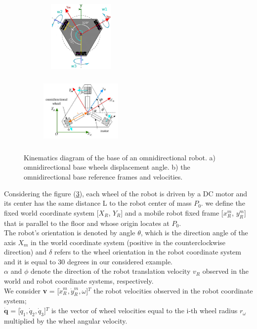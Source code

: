 \begin{figure}[H]
  \centering
  \begin{subfigure}[b]{0.4\textwidth}
     \centering
      \includegraphics[width=4cm, height=3.5cm]{images/03-foundation/triskarbase1}
	\caption{}
	\label{triskar1} 
  \end{subfigure}
  \begin{subfigure}[b]{0.4\textwidth}
  \centering
      \includegraphics[width=4cm, height=3.5cm]{images/03-foundation/triskarbase2}
	\caption{}
	\label{triskar2} 
  \end{subfigure}
  \caption{Kinematics diagram of the base of an omnidirectional robot. a) omnidirectional base wheels displacement angle. b) the omnidirectional base reference frames and velocities.}
\end{figure}

Considering the figure (\ref{triskar2}), each wheel of the robot is driven by a DC motor and its center has the same distance L to the robot center of mass $P_0$. we define the fixed world coordinate system [$X_R$, $Y_R$] and a mobile robot fixed frame [${x}^m_R$, ${y}^m_R$] that is parallel to the floor and whose origin locates at $P_0$.\\
The robot's orientation is denoted by angle $\theta$, which is the direction angle of the axis $X_m$ in the world coordinate system (positive in the
counterclockwise direction) and $\delta$ refers to the wheel orientation in the robot coordinate system and it is equal to 30 degrees in our considered example.
\\
$\alpha$ and $\phi$ denote the direction of the robot translation velocity $v_R$ observed in the world and robot coordinate systems, respectively.\\
We consider \textbf{v} = [$\dot{x}^m_R,\dot{y}^m_R,\omega$]$^T$ the robot velocities observed in the robot coordinate system; \\
$\mathbf{\dot{q}}$ = [$\dot{q}_1,\dot{q}_2,\dot{q}_3$]$^T$ is the vector of wheel velocities equal to the i-th wheel radius $r_\omega$ multiplied by the wheel angular velocity.

